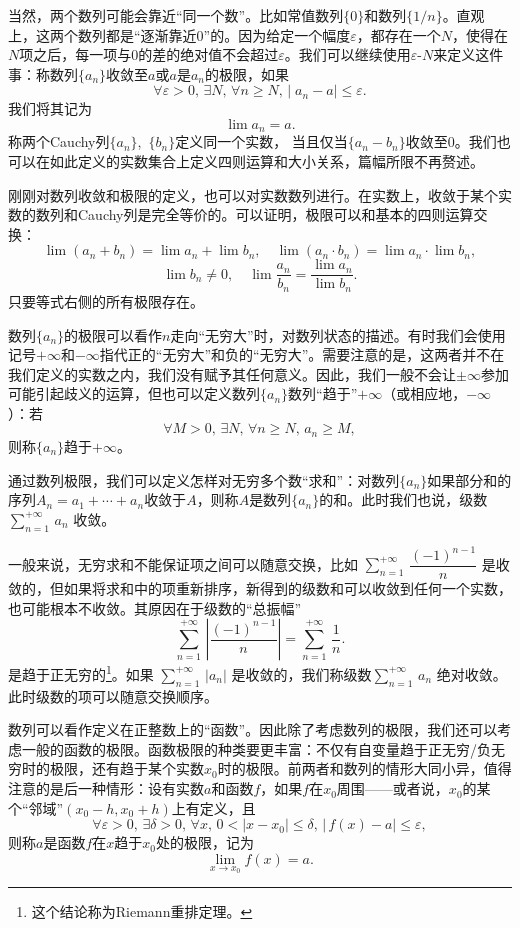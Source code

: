 当然，两个数列可能会靠近“同一个数”。比如常值数列$\{0\}$和数列$\{ 1/n\}$。直观上，这两个数列都是“逐渐靠近$0$”的。因为给定一个幅度$\varepsilon$，都存在一个$N$，使得在$N$项之后，每一项与$0$的差的绝对值不会超过$\varepsilon$。我们可以继续使用$\varepsilon\text{-}N$来定义这件事：称数列$\{a_n\}$收敛至$a$或$a$是$a_n$的极限，如果
\[\forall \varepsilon>0,\,\exists N,\,\forall n\geq N,\,|\;\!a_n-a|\leq \varepsilon.\]
我们将其记为
\[\lim a_n=a.\]
称两个Cauchy列$\{a_n\}$,~$\{b_n\}$定义同一个实数，
当且仅当$\{a_n-b_n\}$收敛至$0$。我们也可以在如此定义的实数集合上定义四则运算和大小关系，篇幅所限不再赘述。

刚刚对数列收敛和极限的定义，也可以对实数数列进行。在实数上，收敛于某个实数的数列和Cauchy列是完全等价的。可以证明，极限可以和基本的四则运算交换：
\[
    \lim(a_n+b_n)=\lim a_n+\lim b_n,\quad\lim(a_n\cdot b_n)=\lim a_n\cdot \lim b_n,
\]
\[\lim b_n\neq 0,\quad\lim \frac {a_n}{b_n}=\frac{\lim a_n}{\lim b_n}.\]
只要等式右侧的所有极限存在。

数列$\{a_n\}$的极限可以看作$n$走向“无穷大”时，对数列状态的描述。有时我们会使用记号$+\infty$和$-\infty$指代正的“无穷大”和负的“无穷大”。需要注意的是，这两者并不在我们定义的实数之内，我们没有赋予其任何意义。因此，我们一般不会让$\pm\infty$参加可能引起歧义的运算，但也可以定义数列$\{a_n\}$数列“趋于”$+\infty$（或相应地，$-\infty$）：若
\[\forall  M>0,\,\exists N,\,\forall n\geq N,\,a_n\geq M,\]
则称$\{a_n\}$趋于$+\infty$。

通过数列极限，我们可以定义怎样对无穷多个数“求和”：对数列$\{a_n\}$如果部分和的序列$A_n=a_1+\cdots +a_n$收敛于$A$，则称$A$是数列$\{a_n\}$的和。此时我们也说，级数
$\sum_{n=1}^{+\infty}\,a_n$
收敛。

一般来说，无穷求和不能保证项之间可以随意交换，比如
$\sum_{n=1}^{+\infty}\,\dfrac{(-1)^{n-1}}{n}$
是收敛的，但如果将求和中的项重新排序，新得到的级数和可以收敛到任何一个实数，也可能根本不收敛。其原因在于级数的“总振幅”
\[\sum_{n=1}^{+\infty}\,\left|\dfrac{(-1)^{n-1}}{n}\right|=\sum_{n=1}^{+\infty}\,\dfrac{1}{n}.\]
是趋于正无穷的\footnote{这个结论称为Riemann重排定理。}。如果
$\sum_{n=1}^{+\infty}\,|a_n|$
是收敛的，我们称级数$\sum_{n=1}^{+\infty}\,a_n$
绝对收敛。此时级数的项可以随意交换顺序。

数列可以看作定义在正整数上的“函数”。因此除了考虑数列的极限，我们还可以考虑一般的函数的极限。函数极限的种类要更丰富：不仅有自变量趋于正无穷/负无穷时的极限，还有趋于某个实数$x_0$时的极限。前两者和数列的情形大同小异，值得注意的是后一种情形：设有实数$a$和函数$f$，如果$f$在$x_0$周围——或者说，$x_0$的某个“邻域”$(x_0-h,x_0+h)$上有定义，且
\[\forall \varepsilon>0,\,\exists \delta>0,\,\forall x,\,0<|x-x_0|\leq \delta,\,\bigl|\,f(x)-a\bigr|\leq \varepsilon,\]
则称$a$是函数$f$在$x$趋于$x_0$处的极限，记为
\[\lim_{x\to x_0}f(x)=a.\]

